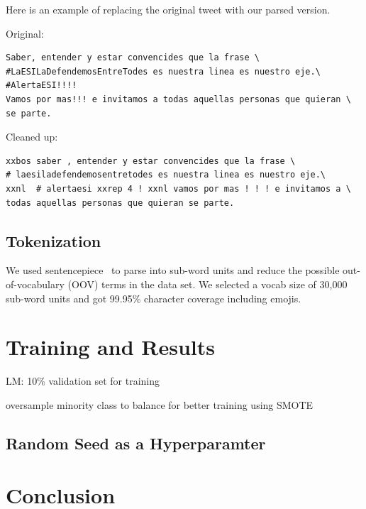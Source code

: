 \pagebreak  %
Here is an example of replacing the original tweet with our parsed version.

Original:
\begin{verbatim} 
Saber, entender y estar convencides que la frase \
#LaESILaDefendemosEntreTodes es nuestra linea es nuestro eje.\
#AlertaESI!!!!
Vamos por mas!!! e invitamos a todas aquellas personas que quieran \
se parte.
\end{verbatim}

Cleaned up:
\begin{verbatim} 
xxbos saber , entender y estar convencides que la frase \
# laesiladefendemosentretodes es nuestra linea es nuestro eje.\
xxnl  # alertaesi xxrep 4 ! xxnl vamos por mas ! ! ! e invitamos a \
todas aquellas personas que quieran se parte.
\end{verbatim}

\subsection{Tokenization}
We used sentencepiece~\cite{DBLP:journals/corr/abs-1808-06226} to parse into sub-word units and reduce the possible out-of-vocabulary (OOV) terms in the data set.  We selected a vocab size of 30,000 sub-word units and got 99.95\% character coverage including emojis.

\section{Training and Results}
\label{sec:4}
LM: 10\% validation set for training


oversample minority class to balance for better training using SMOTE \cite{Chawla:2002:SSM:1622407.1622416}

\subsection{Random Seed as a Hyperparamter}

\section{Conclusion}
\label{sec:5}

